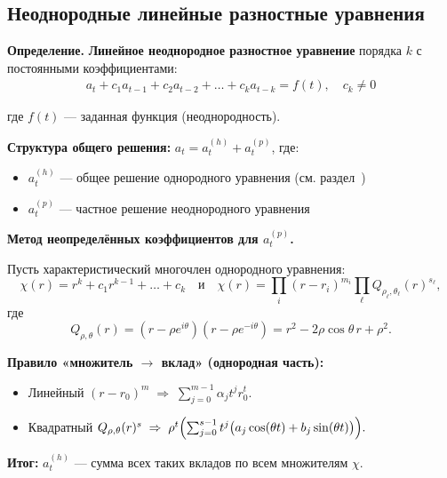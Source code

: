 \subsection{Неоднородные линейные разностные уравнения}\label{sec:inhomogeneous}


\textbf{Определение.} \textbf{Линейное неоднородное разностное уравнение} порядка $k$ с постоянными коэффициентами:
\begin{align}
a_t + c_1 a_{t-1} + c_2 a_{t-2} + \dots + c_k a_{t-k} = f(t), \quad c_k \neq 0
\end{align}

где $f(t)$ — заданная функция (неоднородность).

\textbf{Структура общего решения:} $a_t = a_t^{(h)} + a_t^{(p)}$, где:
\begin{itemize}
\item $a_t^{(h)}$ — общее решение однородного уравнения (см. раздел~)
\item $a_t^{(p)}$ — частное решение неоднородного уравнения
\end{itemize}

\textbf{Метод неопределённых коэффициентов для $a_t^{(p)}$.}

Пусть характеристический многочлен однородного уравнения:
\[
\chi(r) = r^k + c_1 r^{k-1} + \dots + c_k
\quad \text{и} \quad
\chi(r) = \prod_i (r-r_i)^{m_i} \prod_\ell Q_{\rho_\ell, \theta_\ell}(r)^{s_\ell},
\]
где
\[
Q_{\rho,\theta}(r) = (r - \rho e^{i\theta})(r - \rho e^{-i\theta}) = r^2 - 2\rho \cos\theta \, r + \rho^2.
\]

\textbf{Правило «множитель $\to$ вклад» (однородная часть):}

\begin{itemize}
\item Линейный $(r-r_0)^m \;\Rightarrow\; \sum_{j=0}^{m-1} \alpha_j t^j r_0^t.$

\item Квадратный $Q_{\rho,\theta}(r)^s \;\Rightarrow\;
\rho^t \Bigl( \sum_{j=0}^{s-1} t^j \bigl(a_j \cos(\theta t) + b_j \sin(\theta t)\bigr)\Bigr).$
\end{itemize}

\textbf{Итог:} $a_t^{(h)}$ — сумма всех таких вкладов по всем множителям $\chi$.

